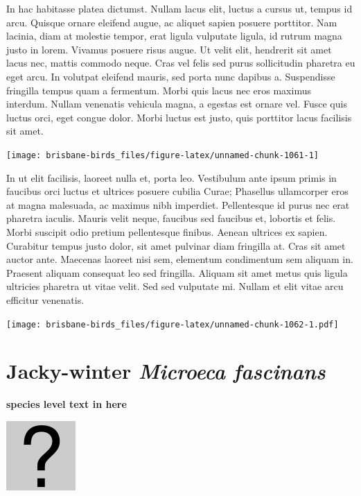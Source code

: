 \documentclass[]{book}
\let\origfigure\figure
\let\endorigfigure\endfigure
\renewenvironment{figure}[1][2] {
  \expandafter\origfigure\expandafter[H]
} {
  \endorigfigure
}
\begin{document}
In hac habitasse platea dictumst. Nullam lacus elit, luctus a cursus ut,
tempus id arcu. Quisque ornare eleifend augue, ac aliquet sapien posuere
porttitor. Nam lacinia, diam at molestie tempor, erat ligula vulputate
ligula, id rutrum magna justo in lorem. Vivamus posuere risus augue. Ut
velit elit, hendrerit sit amet lacus nec, mattis commodo neque. Cras vel
felis sed purus sollicitudin pharetra eu eget arcu. In volutpat eleifend
mauris, sed porta nunc dapibus a. Suspendisse fringilla tempus quam a
fermentum. Morbi quis lacus nec eros maximus interdum. Nullam venenatis
vehicula magna, a egestas est ornare vel. Fusce quis luctus orci, eget
congue dolor. Morbi luctus est justo, quis porttitor lacus facilisis sit
amet.

\begin{figure}
\texttt{[image: brisbane-birds\_files/figure-latex/unnamed-chunk-1061-1]} \caption{insert figure caption}\label{fig:unnamed-chunk-1061}
\end{figure}

In ut elit facilisis, laoreet nulla et, porta leo. Vestibulum ante ipsum
primis in faucibus orci luctus et ultrices posuere cubilia Curae;
Phasellus ullamcorper eros at magna malesuada, ac maximus nibh
imperdiet. Pellentesque id purus nec erat pharetra iaculis. Mauris velit
neque, faucibus sed faucibus et, lobortis et felis. Morbi suscipit odio
pretium pellentesque finibus. Aenean ultrices ex sapien. Curabitur
tempus justo dolor, sit amet pulvinar diam fringilla at. Cras sit amet
auctor ante. Maecenas laoreet nisi sem, elementum condimentum sem
aliquam in. Praesent aliquam consequat leo sed fringilla. Aliquam sit
amet metus quis ligula ultricies pharetra ut vitae velit. Sed sed
vulputate mi. Nullam et elit vitae arcu efficitur venenatis.

\begin{figure}
\centering
\texttt{[image: brisbane-birds\_files/figure-latex/unnamed-chunk-1062-1.pdf]}
\caption{\label{fig:unnamed-chunk-1062}insert figure caption}
\end{figure}

\section{\texorpdfstring{Jacky-winter \emph{Microeca
fascinans}}{Jacky-winter Microeca fascinans}}\label{jacky-winter-microeca-fascinans}

\textbf{species level text in here}

\begin{figure}
\centering
\includegraphics{assets/missing.png}
\caption{No image for species}
\end{figure}
\end{document}
